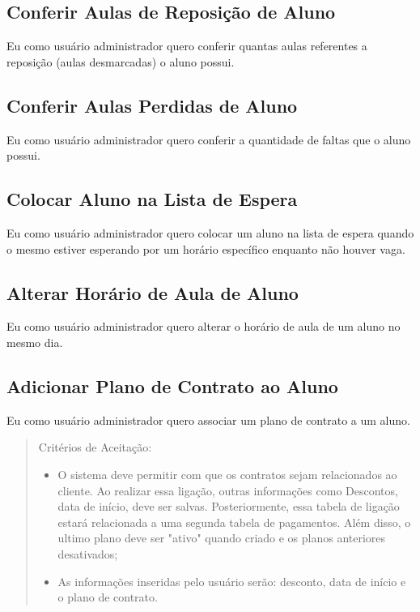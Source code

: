 \subsection[Conferir Aulas de Reposição de Aluno]{Conferir Aulas de Reposição de Aluno}
Eu como usuário administrador quero conferir quantas aulas referentes a
reposição (aulas desmarcadas) o aluno possui.

\subsection[Conferir Aulas Perdidas de Aluno]{Conferir Aulas Perdidas de Aluno}
Eu como usuário administrador quero conferir a quantidade de faltas que o aluno
possui.

\subsection[Colocar Aluno na Lista de Espera]{Colocar Aluno na Lista de Espera}
Eu como usuário administrador quero colocar um aluno na lista de espera quando o
mesmo estiver esperando por um horário específico enquanto não houver vaga.

\subsection[Alterar Horário de Aula de Aluno]{Alterar Horário de Aula de Aluno}
Eu como usuário administrador quero alterar o horário de aula de um aluno no
mesmo dia.

\subsection[Adicionar Plano de Contrato ao Aluno]{Adicionar Plano de Contrato ao Aluno}
Eu como usuário administrador quero associar um plano de contrato a um aluno.

\begin{quote}
Critérios de Aceitação:
    \begin{itemize}
        \item O sistema deve permitir com que os contratos sejam relacionados ao cliente. Ao realizar essa ligação, outras informações como Descontos, data de início, deve ser salvas. Posteriormente, essa tabela de ligação estará relacionada a uma segunda tabela de pagamentos. Além disso, o ultimo plano deve ser "ativo" quando criado e os planos anteriores desativados;
        \item As informações inseridas pelo usuário serão: desconto, data de início e o plano de contrato.
    \end{itemize}
\end{quote} 


